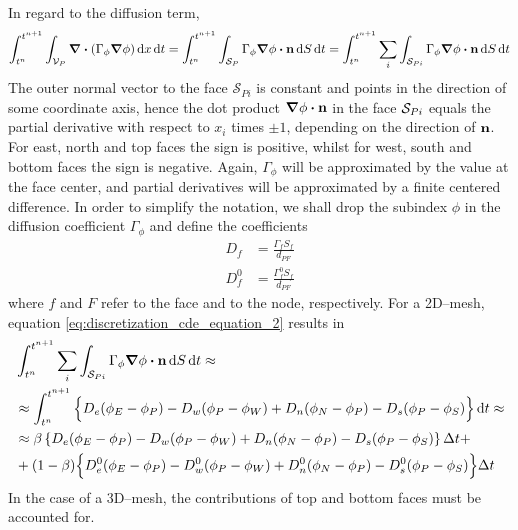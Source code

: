 In regard to the diffusion term,
\begin{equation} \label{eq:discretization_cde_equation_2}
	\int_{t^n}^{t^{n+1}} \int_{\cv{P}} \div(\Gamma_\phi \grad{\phi}) \dd{x} \dd{t} = 
	\int_{t^n}^{t^{n+1}} \int_{\cs{P}} \Gamma_\phi \grad{\phi} \vdot \vb{n} \dd{S} \dd{t} = 
	\int_{t^n}^{t^{n+1}} \sum_i \int_{\cs{Pi}} \Gamma_\phi \grad{\phi} \vdot \vb{n} \dd{S} \dd{t}
\end{equation}
The outer normal vector to the face $\mathcal{S}_{Pi}$ is constant and points in
the direction of some coordinate axis, hence the dot product $\grad{\phi} \vdot
\vb{n}$ in the face $\mathcal{S}_{Pi}$ equals the partial derivative with respect to
$x_i$ times $\pm 1$, depending on the direction of $\vb{n}$. For east, north and
top faces the sign is positive, whilst for west, south and bottom faces the sign
is negative. Again, $\Gamma_\phi$ will be approximated by the value at the face
center, and partial derivatives will be approximated by a finite centered
difference. In order to simplify the notation, we shall drop the subindex $\phi$ in the diffusion
coefficient $\Gamma_\phi$ and define the coefficients
\begin{align}
	D_f &= \frac{\Gamma_f S_f}{d_{PF}} \\
	D_f^0 &= \frac{\Gamma_f^0 S_f}{d_{PF}}
\end{align}
where $f$ and $F$ refer to the face and to the node, respectively. For a 2D--mesh, equation
\eqref{eq:discretization_cde_equation_2} results in
\begin{align}
	&\int_{t^n}^{t^{n+1}} \sum_i \int_{\cs{Pi}} \Gamma_\phi \grad{\phi} \vdot \vb{n} \dd{S} \dd{t} 
	\approx \nonumber \\ 
	&\approx 
	\int_{t^n}^{t^{n+1}}
	\Big\{ 
	D_e (\phi_E - \phi_P) - D_w (\phi_P - \phi_W) + D_n (\phi_N - \phi_P) - D_s (\phi_P - \phi_S) 
	\Big\} \dd{t} \approx \nonumber \\
	&\approx
	\beta 
	\left\{ 
		D_e (\phi_E - \phi_P) - D_w (\phi_P - \phi_W) + D_n (\phi_N - \phi_P) - D_s (\phi_P - \phi_S) 
	\right\} \Delta t + \nonumber \\
	&+ (1 - \beta)
	\Big\{ 
		D_e^0 (\phi_E - \phi_P) - D_w^0 (\phi_P - \phi_W) + D_n^0 (\phi_N - \phi_P) - D_s^0 (\phi_P - \phi_S) 
	\Big\} \Delta t
\end{align}
In the case of a 3D--mesh, the contributions of top and bottom faces must be
accounted for.

